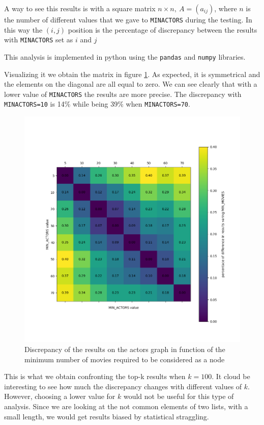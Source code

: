 \nd A way to see this results is with a square matrix $n \times n, ~ A = (a_{ij})$, where $n$ is the number of different values that we gave to \texttt{MIN\textunderscore ACTORS} during the testing. In this way the $(i,j)$ position is the percentage of discrepancy between the results with \texttt{MIN\textunderscore ACTORS} set as $i$ and $j$ \s

\nd This analysis is implemented in python using the \texttt{pandas} and \texttt{numpy} libraries.



\nd Visualizing it we obtain the matrix in figure \ref{fig:matrix-a}. As expected, it is symmetrical and the elements on the diagonal are all equal to zero. We can see clearly that with a lower value of \texttt{MIN\textunderscore ACTORS} the results are more precise. The discrepancy with \texttt{MIN\textunderscore ACTORS=10} is 14\% while being 39\% when \texttt{MIN\textunderscore ACTORS=70}.

\begin{figure}[h!]
    \centering
    \includegraphics[width=11.5cm]{Figure_1.png}
    \caption{Discrepancy of the results on the actors graph in function of the minimum number of movies required to be considered as a node}
    \label{fig:matrix-a}
\end{figure}
\s
\nd This is what we obtain confronting the top-k results when $k=100$. It cloud be interesting to see how much the discrepancy changes with different values of $k$. However, choosing a lower value for $k$ would not be useful for this type of analysis. Since we are looking at the not common elements of two lists, with a small length, we would get results biased by statistical straggling. \s

